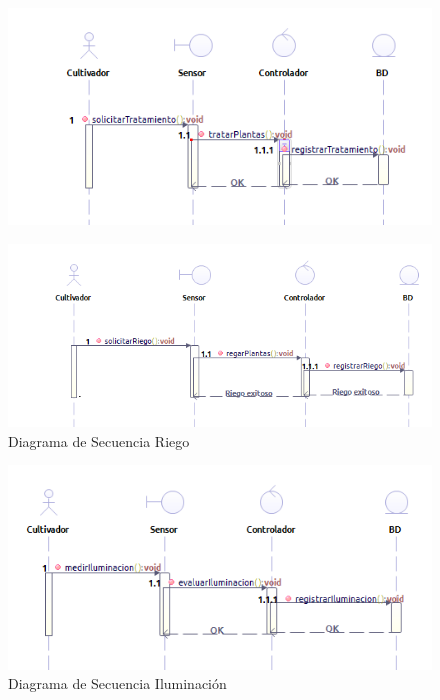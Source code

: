 \begin{table}[]
\begin{figure}
	\centering
	\includegraphics[width=1\linewidth]{proyecto/imgs/SecuenciaTierra}
	\caption{}
	\label{fig:secuenciatierra}
\end{figure}


\begin{figure}[h!]
	\centering
	\includegraphics[width=1.0\linewidth]{proyecto/imgs/SecuenciaRiego}
	\caption{Diagrama de Secuencia Riego}
	\label{fig:secuenciariego}
\end{figure}

\begin{figure}[h!]
	\centering
	\includegraphics[width=1.0\linewidth]{proyecto/imgs/SecuenciaIluminacion}
	\caption{Diagrama de Secuencia Iluminación}
	\label{fig:secuenciailuminacion}
\end{figure}


\end{table}
